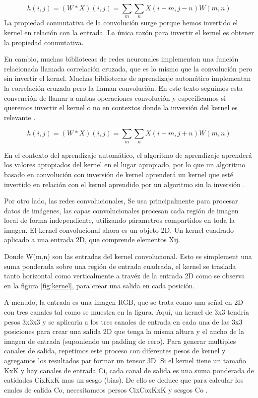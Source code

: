 	\begin{equation}
		\label{eq:cnn4}
		h(i, j) = (W * X)(i, j) = \sum_{m} \sum_{n} X(i - m, j - n) W(m, n)
	\end{equation}
	La propiedad conmutativa de la convolución surge porque hemos invertido el kernel en relación con la entrada. La única razón para invertir el kernel es obtener la propiedad conmutativa.
	
	En cambio, muchas bibliotecas de redes neuronales implementan una función relacionada llamada correlación cruzada, que es lo mismo que la convolución pero sin invertir el kernel. Muchas bibliotecas de aprendizaje automático implementan la correlación cruzada pero la llaman convolución. En este texto seguimos esta convención de llamar a ambas operaciones convolución y especificamos si queremos invertir el kernel o no en contextos donde la inversión del kernel es relevante \parencite{Goodfellow-et-al-2016}.
	
	\begin{equation}
		\label{eq:cnn5}
		h(i, j) = (W * X)(i, j) = \sum_{m} \sum_{n} X(i + m, j + n) W(m, n)
	\end{equation}
	
	En el contexto del aprendizaje automático, el algoritmo de aprendizaje aprenderá los valores apropiados del kernel en el lugar apropiado, por lo que un algoritmo basado en convolución con inversión de kernel aprenderá un kernel que esté invertido en relación con el kernel aprendido por un algoritmo sin la inversión \parencite{Goodfellow-et-al-2016}.
	
	Por otro lado, las redes convolucionales, Se usa principalmente para procesar datos de imágenes, las capas convolucionales procesan cada región de imagen local de forma independiente, utilizando párametros compartidos en toda la imagen.
	El kernel convolucional ahora es un objeto 2D. Un kernel cuadrado aplicado a una entrada 2D, que comprende elementos Xij.
	
	Donde W(m,n) son las entradas del kernel convolucional. Esto es simplement una suma ponderada sobre una región de entrada cuadrada, el kernel se traslada tanto horizontal como verticalmente a travéz de la entrada 2D como se observa en la figura \ref{fig:kernel}, para crear una salida en cada posición.
	
	A menudo, la entrada es una imagen RGB, que se trata como una señal en 2D con tres canales tal como se muestra en la figura. Aquí, un kernel de 3x3 tendría pesos 3x3x3 y se aplicaria a los tres canales de entrada en cada una de las 3x3 posiciones para crear una salida 2D que tenga la misma altura y el ancho de la imagen de entrada (suponiendo un padding de cero). Para generar multiples canales de salida, repetimos este proceso con diferentes pesos de kernel y agregamos los resultados par formar un tensor 3D. Si el kernel tiene un tamaño KxK y hay canales de entrada Ci, cada canal de salida es una suma ponderada de catidades CixKxK mas un sesgo (bias). De ello se deduce que para calcular los cnales de calida Co, necesitameos persos CixCoxKxK y sesgos Co \parencite{prince2023understanding}.
	
